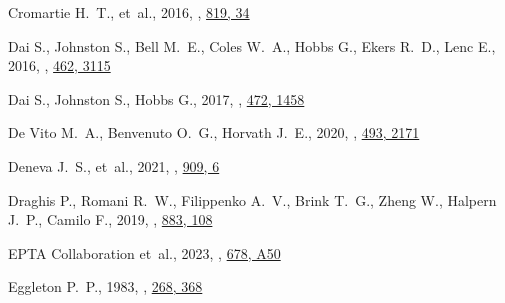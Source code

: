 \documentclass[fleqn,usenatbib]{mnras}
\begin{document}
\begin{thebibliography}{99}
{Cromartie} H.~T.,  et~al., 2016, , \href {https://ui.adsabs.harvard.edu/abs/2016ApJ...819...34C} {819, 34}

{Dai} S.,  {Johnston} S.,  {Bell} M.~E.,  {Coles} W.~A.,  {Hobbs} G.,  {Ekers} R.~D.,   {Lenc} E.,  2016, , \href {https://ui.adsabs.harvard.edu/abs/2016MNRAS.462.3115D} {462, 3115}

{Dai} S.,  {Johnston} S.,   {Hobbs} G.,  2017, , \href {https://ui.adsabs.harvard.edu/abs/2017MNRAS.472.1458D} {472, 1458}

{De Vito} M.~A.,  {Benvenuto} O.~G.,   {Horvath} J.~E.,  2020, , \href {https://ui.adsabs.harvard.edu/abs/2020MNRAS.493.2171D} {493, 2171}

{Deneva} J.~S.,  et~al., 2021, , \href {https://ui.adsabs.harvard.edu/abs/2021ApJ...909....6D} {909, 6}

{Draghis} P.,  {Romani} R.~W.,  {Filippenko} A.~V.,  {Brink} T.~G.,  {Zheng} W.,  {Halpern} J.~P.,   {Camilo} F.,  2019, , \href {https://ui.adsabs.harvard.edu/abs/2019ApJ...883..108D} {883, 108}

{EPTA Collaboration} et~al., 2023, , \href {https://ui.adsabs.harvard.edu/abs/2023A&A...678A..50E} {678, A50}

{Eggleton} P.~P.,  1983, , \href {https://ui.adsabs.harvard.edu/abs/1983ApJ...268..368E} {268, 368}


\end{thebibliography}
\end{document}
